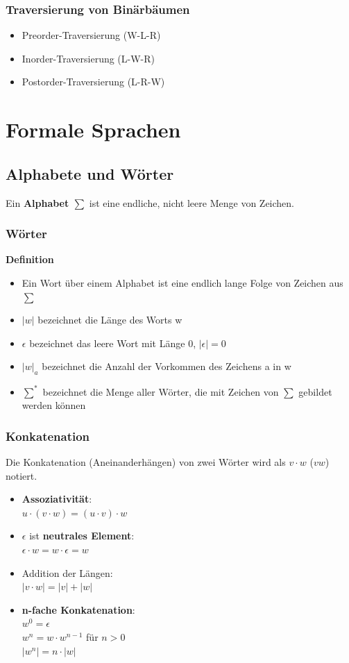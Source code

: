 \documentclass{scrreprt}
\begin{document}
\subsection{Traversierung von Binärbäumen}
\begin{itemize}
    \item Preorder-Traversierung (W-L-R)
    \item Inorder-Traversierung (L-W-R)
    \item Postorder-Traversierung (L-R-W)
\end{itemize}
\pagebreak
\chapter{Formale Sprachen}
\section{Alphabete und Wörter}
Ein \textbf{Alphabet $\sum$} ist eine endliche, nicht leere Menge von Zeichen.
\subsection{Wörter}
\textbf{Definition}
\begin{itemize}
    \item Ein Wort über einem Alphabet ist eine endlich lange Folge von Zeichen aus $\sum$
    \item $|w|$ bezeichnet die Länge des Worts w
    \item $\epsilon$ bezeichnet das leere Wort mit Länge 0, $|\epsilon|=0$
    \item $|w|_{a}$ bezeichnet die Anzahl der Vorkommen des Zeichens a in w
    \item $\sum^{*}$ bezeichnet die Menge aller Wörter, die mit Zeichen von $\sum$ gebildet werden können
\end{itemize}
\subsection{Konkatenation}
Die Konkatenation (Aneinanderhängen) von zwei Wörter wird als $v \cdot w$ ($vw$) notiert.
\begin{itemize}
    \item \textbf{Assoziativität}:
    \\$u \cdot (v \cdot w) = (u \cdot v) \cdot w$
    \item $\epsilon$ ist \textbf{neutrales Element}:
    \\$\epsilon \cdot w = w \cdot \epsilon = w$
    \item Addition der Längen:
    \\$|v \cdot w| = |v| + |w|$
    \item \textbf{n-fache Konkatenation}:
    \\$w^{0} = \epsilon$
    \\$w^{n} = w \cdot w^{n-1}$ für $n > 0$
    \\$|w^{n}| = n \cdot |w|$
\end{itemize}
\end{document}
